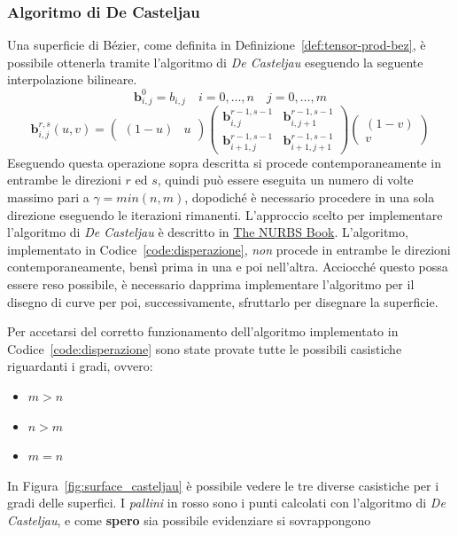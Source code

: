 \documentclass[a4paper, 12pt]{article}
\begin{document}
\subsubsection{Algoritmo di De Casteljau}
Una superficie di Bézier, come definita in Definizione~\ref{def:tensor-prod-bez}, è possibile 
ottenerla tramite l'algoritmo di \textit{De Casteljau} eseguendo la seguente interpolazione bilineare.
$$\mathbf{b}^0_{i,j} = b_{i, j} \quad i = 0, \dots, n \quad j = 0, \dots, m$$
$$\mathbf{b}^{r,s}_{i,j}(u, v) = \begin{pmatrix} (1-u) & u\end{pmatrix}  \begin{pmatrix} \mathbf{b}^{r-1,s-1}_{i,j} & \mathbf{b}^{r-1,s-1}_{i,j+1} \\ \mathbf{b}^{r-1,s-1}_{i+1,j} & \mathbf{b}^{r-1,s-1}_{i+1,j+1}\end{pmatrix}  \begin{pmatrix}
  (1-v) \\ v
\end{pmatrix} $$
Eseguendo questa operazione sopra descritta si procede contemporaneamente in entrambe le direzioni $r$ ed $s$, 
quindi può essere eseguita un numero di volte massimo pari a
$\gamma = min(n, m)$, dopodiché è necessario procedere in una sola direzione eseguendo le iterazioni rimanenti.
L'approccio scelto per implementare l'algoritmo di 
\textit{De Casteljau} è descritto in \href{https://www.springer.com/la/book/9783642973857}{The NURBS Book}. 
L'algoritmo, implementato in Codice~\ref{code:disperazione}, \textit{non} procede in entrambe
le direzioni contemporaneamente, bensì prima in una e poi nell'altra. Acciocché questo possa essere reso possibile, 
è necessario dapprima implementare l'algoritmo per il disegno di curve per poi, successivamente, 
sfruttarlo per disegnare la superficie.

Per accetarsi del corretto funzionamento dell'algoritmo implementato in Codice~\ref{code:disperazione}
sono state provate tutte le possibili casistiche riguardanti i gradi, ovvero:
\begin{itemize}
  \item $m > n$
  \item $n > m$
  \item $m = n$
\end{itemize}
In Figura~\ref{fig:surface_casteljau} è possibile vedere le tre diverse casistiche per i gradi delle superfici. I \textit{pallini} in rosso
sono i punti calcolati con l'algoritmo di \textit{De Casteljau}, e come \textbf{spero} sia possibile evidenziare si sovrappongono 
\end{document}
